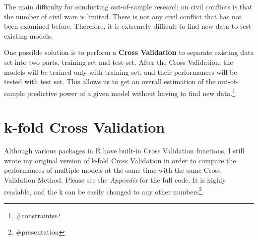 \documentclass{article}
\begin{document}
The main difficulty for conducting out-of-sample research on civil conflicts is that the number of civil wars is limited. There is not any civil conflict that has not been examined before. Therefore, it is extremely difficult to find new data to test existing models.

One possible solution is to perform a \textbf{Cross Validation} to separate existing data set into two parts, training set and test set. After the Cross Validation, the models will be trained only with training set, and their performances will be tested with test set. This allows us to get an overall estimation of the out-of-sample predictive power of a given model without having to find new data.\footnote{\#constraints}

\section{k-fold Cross Validation}

Although various packages in R have built-in Cross Validation functions, I still wrote my original version of k-fold Cross Validation in order to compare the performances of multiple models at the same time with the same Cross Validation Method. Please see the \textit{Appendix} for the full code. It is highly readable, and the k can be easily changed to any other numbers\footnote{\#presentation}.
\end{document}
